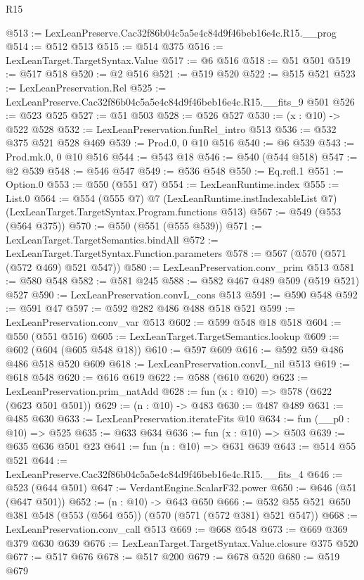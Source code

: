 \begin{lexlean}{R15}
\begin{coremodule}
@513 := LexLeanPreserve.Cac32f86b04c5a5e4c84d9f46beb16e4c.R15.__prog
@514 := @512 @513
@515 := @514 @375
@516 := LexLeanTarget.TargetSyntax.Value
@517 := @6 @516
@518 := @51 @501
@519 := @517 @518
@520 := @2 @516
@521 := @519 @520
@522 := @515 @521
@523 := LexLeanPreservation.Rel
@525 := LexLeanPreserve.Cac32f86b04c5a5e4c84d9f46beb16e4c.R15.__fits_9 @501
@526 := @523 @525
@527 := @51 @503
@528 := @526 @527
@530 := (x : @10) -> @522 @528
@532 := LexLeanPreservation.funRel_intro @513
@536 := @532 @375 @521 @528 @469
@539 := Prod.{0, 0} @10 @516
@540 := @6 @539
@543 := Prod.mk.{0, 0} @10 @516
@544 := @543 @18
@546 := @540 (@544 @518)
@547 := @2 @539
@548 := @546 @547
@549 := @536 @548
@550 := Eq.refl.{1}
@551 := Option.{0}
@553 := @550 (@551 @7)
@554 := LexLeanRuntime.index
@555 := List.{0}
@564 := @554
    (@555 @7)
    @7
    (LexLeanRuntime.instIndexableList @7)
    (LexLeanTarget.TargetSyntax.Program.functions @513)
@567 := @549 (@553 (@564 @375))
@570 := @550 (@551 (@555 @539))
@571 := LexLeanTarget.TargetSemantics.bindAll
@572 := LexLeanTarget.TargetSyntax.Function.parameters
@578 := @567 (@570 (@571 (@572 @469) @521 @547))
@580 := LexLeanPreservation.conv_prim @513
@581 := @580 @548
@582 := @581 @245
@588 := @582 @467 @489 @509 (@519 @521) @527
@590 := LexLeanPreservation.convL_cons @513
@591 := @590 @548
@592 := @591 @47
@597 := @592 @282 @486 @488 @518 @521
@599 := LexLeanPreservation.conv_var @513
@602 := @599 @548 @18 @518
@604 := @550 (@551 @516)
@605 := LexLeanTarget.TargetSemantics.lookup
@609 := @602 (@604 (@605 @548 @18))
@610 := @597 @609
@616 := @592 @59 @486 @486 @518 @520 @609
@618 := LexLeanPreservation.convL_nil @513
@619 := @618 @548
@620 := @616 @619
@622 := @588 (@610 @620)
@623 := LexLeanPreservation.prim_natAdd
@628 := fun (x : @10) => @578 (@622 (@623 @501 @501))
@629 := (n : @10) -> @483
@630 := @487 @489
@631 := @485 @630
@633 := LexLeanPreservation.iterateFits @10
@634 := fun (__p0 : @10) => @525
@635 := @633 @634
@636 := fun (x : @10) => @503
@639 := @635 @636 @501 @23
@641 := fun (n : @10) => @631 @639
@643 := @514 @55 @521
@644 := LexLeanPreserve.Cac32f86b04c5a5e4c84d9f46beb16e4c.R15.__fits_4
@646 := @523 (@644 @501)
@647 := VerdantEngine.ScalarF32.power
@650 := @646 (@51 (@647 @501))
@652 := (n : @10) -> @643 @650
@666 := @532 @55 @521 @650 @381 @548 (@553 (@564 @55)) (@570 (@571 (@572 @381) @521 @547))
@668 := LexLeanPreservation.conv_call @513
@669 := @668 @548
@673 := @669 @369 @379 @630 @639
@676 := LexLeanTarget.TargetSyntax.Value.closure @375 @520
@677 := @517 @676
@678 := @517 @200
@679 := @678 @520
@680 := @519 @679

\end{coremodule}
\end{lexlean}
